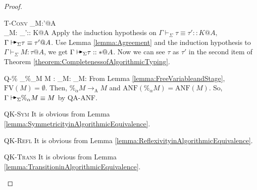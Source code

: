 \documentclass[9pt, a4paper]{extarticle}
\theoremstyle{break}
\newcommand{\G}{\Gamma}
\newcommand{\V}{\vdash_\Sigma}
\newcommand{\TB}{{\mathop{\blacktriangleright}}}
\newcommand{\E}{\equiv}
\newcommand{\FV}{\text{FV}}
\newcommand{\TConv}{\textsc{T-Conv}\xspace}
\newcommand{\QKRefl}{\textsc{QK-Refl}\xspace}
\newcommand{\QKSym}{\textsc{QK-Sym}\xspace}
\newcommand{\QKTrans}{\textsc{QK-Trans}\xspace}
\newcommand{\QPercent}{\textsc{Q-\%}\xspace}
\newcommand{\QAANF}{\textsc{QA-ANF}\xspace}
\newcommand{\RA}{\longrightarrow_{\text{A}}}
\newcommand{\AV}{\vdash\!\!\!\raisebox{0.4ex}{\scalebox{0.7}{$\TB$}}}
\newcommand{\AVS}{\AV_\Sigma\xspace}
\newcommand{\ANF}{\text{ANF}}
\begin{document}
\begin{proof}
    \begin{rneqncase}{\TConv}{
            \G\V M:\tau'@A \\
            \G\V M:\tau@A {}
            \G\V \tau\equiv \tau':: K@A
        }
        Apply the induction hypothesis on \( \G\V \tau\equiv \tau':: K@A \), \(
        \G\AVS \tau\equiv \tau' @A \).  Use Lemma \ref{lemma:Agreement} and the
        induction hypothesis to \( \G\V M : \tau @A \), we get \( \G\AVS \tau
        :: * @ A \). Now we can see \( \tau \) as \( \tau' \) in the second
        item of Theorem \ref{theorem:CompletenessofAlgorithmicTyping}.
    \end{rneqncase}
    \begin{rneqncase}{\QPercent}{
            \G\V\%_\alpha M \E M : 
            \G\V M: 
            \G\V M:\tau@A
        }
        From Lemma \ref{lemma:FreeVariableandStage}, \( \FV(M) = \emptyset \). Then, \( \%_\alpha M \RA M \) and \( \ANF(\%_\alpha M) = \ANF(M) \). So, \( \G\AVS\%_\alpha M \E M \) by \QAANF.
    \end{rneqncase}
    \begin{rneqncase}{\QKSym}{}
        It is obvious from Lemma \ref{lemma:SymmetricityinAlgorithmicEquivalence}.
    \end{rneqncase}
    \begin{rneqncase}{\QKRefl}{}
        It is obvious from Lemma \ref{lemma:ReflexivityinAlgorithmicEquivalence}.
    \end{rneqncase}
    \begin{rneqncase}{\QKTrans}{}
        It is obvious from Lemma \ref{lemma:TransitioninAlgorithmicEquivalence}.
    \end{rneqncase}
\end{proof}
\end{document}
